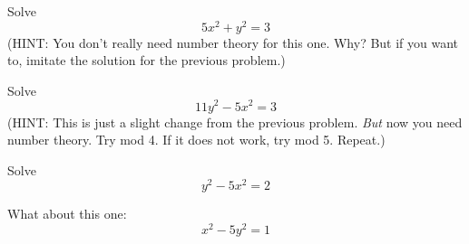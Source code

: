 \mbox{}
  \begin{myenum}
  \item
    Solve
    \[
      5x^2 + y^2 = 3
    \]
    (HINT: You don't really need number theory for this one. Why?
    But if you want to, imitate the solution for the previous
    problem.)
  \item
    Solve
    \[
      11y^2 - 5x^2 = 3
    \]
    (HINT: This is just a slight change from the
    previous problem. \textit{But} now you need number theory. Try mod 4.
    If it does not work, try mod 5. Repeat.)
  \item
    Solve
    \[
      y^2 - 5x^2 = 2
    \]

  \item
    What about this one:
    \[
      x^2 - 5y^2 = 1
    \]    
  \end{myenum}
